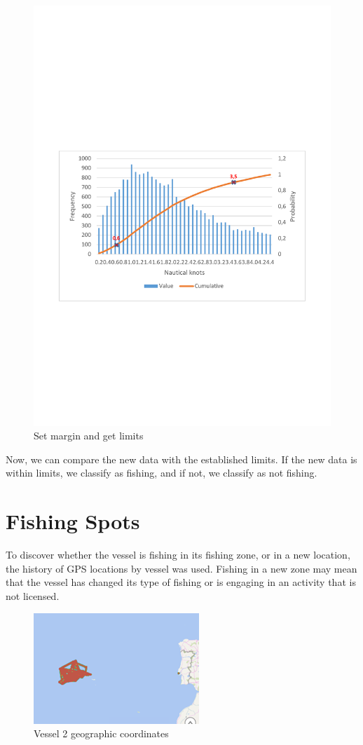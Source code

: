 \begin{figure}[H]
    \centering
    \includegraphics[trim=300 250 300 300,height=0.5\linewidth]{Chapters/img/hc_8.pdf}
    \caption{Set margin and get limits}
    \label{fig:app_b_8}
\end{figure}


Now, we can compare the new data with the established limits. If the new data is within limits, we classify as fishing, and if not, we classify as not fishing.



\section{Fishing Spots} %
\label{sub:fishing_spots}

To discover whether the vessel is fishing in its fishing zone, or in a new location, the history of GPS locations by vessel was used.
Fishing in a new zone may mean that the vessel has changed its type of fishing or is engaging in an activity that is not licensed.


\begin{figure}[H]
\centering
\includegraphics[width=0.8\linewidth]{Chapters/img/gps_vessel2.png}
\caption{Vessel 2 geographic coordinates}
\label{fig:gps_vessel2}
\end{figure}

